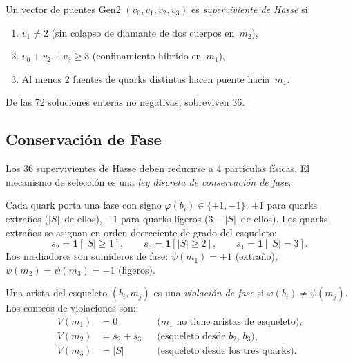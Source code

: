 \documentclass[11pt, a4paper, openany]{book}
\begin{document}
\begin{definition}
\label{def:hasse-survival}
Un vector de puentes Gen2 $(v_0, v_1, v_2, v_3)$ es
\emph{superviviente de Hasse} si:
\begin{enumerate}
  \item $v_1 \neq 2$ (sin colapso de diamante de dos cuerpos
    en~$m_2$),
  \item $v_0 + v_2 + v_3 \geq 3$ (confinamiento h\'ibrido
    en~$m_1$),
  \item Al menos 2 fuentes de quarks distintas hacen puente
    hacia~$m_1$.
\end{enumerate}
De las 72 soluciones enteras no negativas, sobreviven 36.
\end{definition}

\subsection{Conservaci\'on de Fase}

Los 36 supervivientes de Hasse deben reducirse a 4 part\'iculas
f\'isicas.  El mecanismo de selecci\'on es una \emph{ley discreta de
conservaci\'on de fase}.

\begin{definition}
\label{def:phase-assign}
Cada quark porta una fase con signo
$\varphi(b_i) \in \{+1, -1\}$: $+1$ para quarks extra\~nos
($|S|$~de ellos), $-1$ para quarks ligeros ($3 - |S|$~de ellos).
Los quarks extra\~nos se asignan en orden decreciente de grado del
esqueleto:
\[
  s_2 = \mathbf{1}[|S| \geq 1], \qquad
  s_3 = \mathbf{1}[|S| \geq 2], \qquad
  s_1 = \mathbf{1}[|S| = 3].
\]
Los mediadores son sumideros de fase: $\psi(m_1) = +1$ (extra\~no),
$\psi(m_2) = \psi(m_3) = -1$ (ligeros).
\end{definition}

\begin{definition}
\label{def:backbone-violation}
Una arista del esqueleto $(b_i, m_j)$ es una \emph{violaci\'on de
fase} si $\varphi(b_i) \neq \psi(m_j)$.  Los conteos de
violaciones son:
\begin{align*}
  V(m_1) &= 0 &&\text{($m_1$ no tiene aristas de esqueleto),} \\
  V(m_2) &= s_2 + s_3 &&\text{(esqueleto desde $b_2$, $b_3$),} \\
  V(m_3) &= |S| &&\text{(esqueleto desde los tres quarks).}
\end{align*}
\end{definition}
\end{document}
